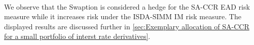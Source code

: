             \begin{tcolorbox}[breakable, size=fbox, boxrule=.5pt, pad at break*=1mm, opacityfill=0]
\begin{center}
    \end{center}
    { \hspace*{\fill} \\}
\end{tcolorbox}
        
    We observe that the Swaption is considered a hedge for the SA-CCR EAD
risk measure while it increases risk under the ISDA-SIMM IM risk
measure. The displayed results are discussed further in
\ref{sec:Exemplary allocation of SA-CCR for a small portfolio of interst rate derivatives}.


